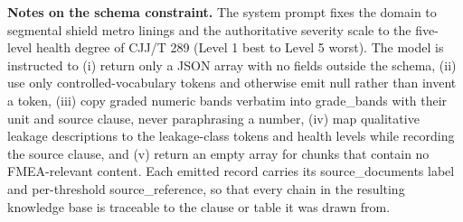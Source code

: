 \documentclass[preprint,12pt,authoryear]{elsarticle}
\begin{document}
\textbf{Notes on the schema constraint.} The system prompt fixes the
domain to segmental shield metro linings and the authoritative severity
scale to the five-level health degree of CJJ/T 289 (Level 1 best to
Level 5 worst). The model is instructed to (i) return only a JSON array
with no fields outside the schema, (ii) use only controlled-vocabulary
tokens and otherwise emit null rather than invent a token, (iii) copy
graded numeric bands verbatim into grade\_bands with their unit and
source clause, never paraphrasing a number, (iv) map qualitative leakage
descriptions to the leakage-class tokens and health levels while
recording the source clause, and (v) return an empty array for chunks
that contain no FMEA-relevant content. Each emitted record carries its
source\_documents label and per-threshold source\_reference, so that
every chain in the resulting knowledge base is traceable to the clause
or table it was drawn from.
\end{document}
